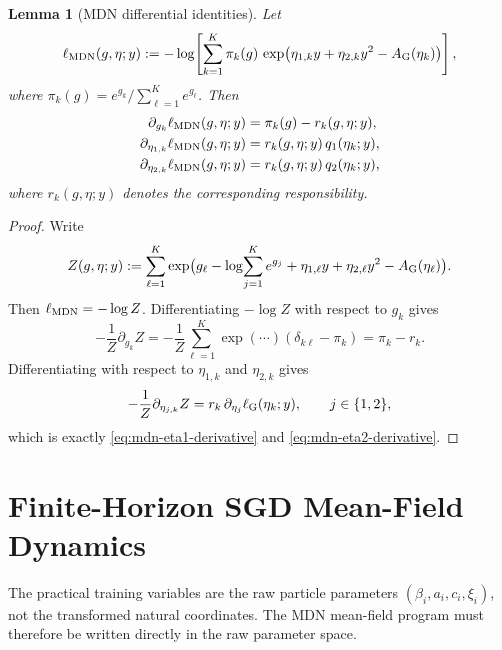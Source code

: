 \documentclass[11pt]{article}
\newtheorem{lemma}[theorem]{Lemma}
\theoremstyle{definition}
\begin{document}
\begin{lemma}[MDN differential identities]
\label{lem:mdn-differential-identities}
Let
\[
  \ell_{\rm MDN}(g,\eta;y)
  :=
  -\log\!\left[
    \sum_{k=1}^K
    \pi_k(g)\,
    \exp\!\big(
      \eta_{1,k}y+\eta_{2,k}y^2-A_{\rm G}(\eta_k)
    \big)
  \right],
\]
where $\pi_k(g)=e^{g_k}/\sum_{\ell=1}^K e^{g_\ell}$. Then
\begin{align}
  \partial_{g_k}\ell_{\rm MDN}(g,\eta;y)
  &=
  \pi_k(g)-r_k(g,\eta;y),
  \label{eq:mdn-gate-derivative}
  \\
  \partial_{\eta_{1,k}}\ell_{\rm MDN}(g,\eta;y)
  &=
  r_k(g,\eta;y)\,q_1(\eta_k;y),
  \label{eq:mdn-eta1-derivative}
  \\
  \partial_{\eta_{2,k}}\ell_{\rm MDN}(g,\eta;y)
  &=
  r_k(g,\eta;y)\,q_2(\eta_k;y),
  \label{eq:mdn-eta2-derivative}
\end{align}
where $r_k(g,\eta;y)$ denotes the corresponding responsibility.
\end{lemma}

\begin{proof}
Write
\[
  Z(g,\eta;y)
  :=
  \sum_{\ell=1}^K
  \exp\!\big(
    g_\ell-\log\!\sum_{j=1}^K e^{g_j}
    +\eta_{1,\ell}y+\eta_{2,\ell}y^2-A_{\rm G}(\eta_\ell)
  \big).
\]
Then $\ell_{\rm MDN}=-\log Z$. Differentiating $-\log Z$ with respect to $g_k$
gives
\[
  -\frac{1}{Z}\partial_{g_k}Z
  =
  -\frac{1}{Z}\sum_{\ell=1}^K
  \exp(\cdots)(\delta_{k\ell}-\pi_k)
  =
  \pi_k-r_k.
\]
Differentiating with respect to $\eta_{1,k}$ and $\eta_{2,k}$ gives
\[
  -\frac{1}{Z}\partial_{\eta_{j,k}}Z
  =
  r_k\,\partial_{\eta_j}\ell_{\rm G}(\eta_k;y),
  \qquad j\in\{1,2\},
\]
which is exactly \eqref{eq:mdn-eta1-derivative} and
\eqref{eq:mdn-eta2-derivative}.
\end{proof}

\section{Finite-Horizon SGD Mean-Field Dynamics}

The practical training variables are the raw particle parameters
$(\beta_i,a_i,c_i,\xi_i)$, not the transformed natural coordinates. The MDN
mean-field program must therefore be written directly in the raw parameter
space.
\end{document}
